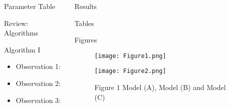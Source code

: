 \begin{frame}[t]
\begin{columns}[t]
\begin{column}{\onecolwid}
\begin{alertblock}{Parameter Table}
\end{alertblock}
\begin{alertblock}{Review: Algorithms}
\begin{algorithm}[H]
	\begin{algorithmic}[1]
	\end{algorithmic}
\caption{Algorithm I}
\label{Algorithm_1}
\end{algorithm}
\begin{itemize}
	\item Observation 1: \\
	\item Observation 2:  \\
	\item Observation 3:  \\
\end{itemize}	
\end{alertblock}
\end{column}
\begin{column}{\onecolwid} %
\begin{alertblock}{Results}
\end{alertblock}
\begin{alertblock}{Tables}
\end{alertblock}
\begin{alertblock}{Figures}
\begin{figure}[H]
	\centering
	\begin{minipage}[b]{0.5\linewidth}
		\texttt{[image: Figure1.png]}
	\end{minipage}\hfill
	\begin{minipage}[b]{0.5\linewidth}
		\texttt{[image: Figure2.png]}
	\end{minipage}\hfill
	\caption{Figure 1 Model (A), Model (B) and Model (C)}

\end{figure}
\end{alertblock}
\end{column}
\end{columns}
\end{frame}
